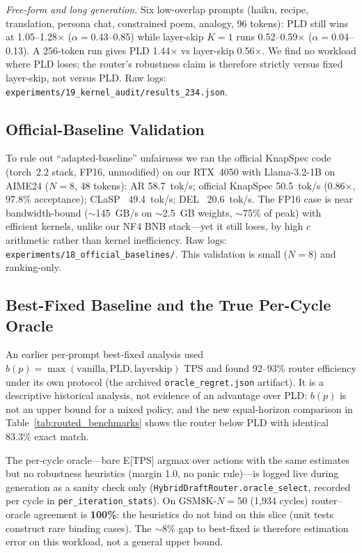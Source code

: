 \documentclass[10pt,twocolumn,letterpaper]{article}
\begin{document}
\textit{Free-form and long generation.} Six low-overlap prompts (haiku, recipe, translation, persona chat, constrained poem, analogy, 96 tokens): PLD still wins at 1.05--1.28$\times$ ($\alpha{=}0.43$--0.85) while layer-skip $K{=}1$ runs 0.52--0.59$\times$ ($\alpha{=}0.04$--0.13). A 256-token run gives PLD 1.44$\times$ vs layer-skip 0.56$\times$. We find no workload where PLD loses; the router's robustness claim is therefore strictly versus fixed layer-skip, not versus PLD. Raw logs: \texttt{experiments/19\_kernel\_audit/results\_234.json}.

\subsection{Official-Baseline Validation}
\label{sec:official}

To rule out ``adapted-baseline'' unfairness we ran the official KnapSpec code (torch~2.2 stack, FP16, unmodified) on our RTX~4050 with Llama-3.2-1B on AIME24 ($N{=}8$, 48 tokens): AR 58.7~tok/s; official KnapSpec 50.5~tok/s (0.86$\times$, 97.8\% acceptance); CLaSP~\cite{clasp2025} 49.4~tok/s; DEL~\cite{del2025} 20.6~tok/s. The FP16 case is near bandwidth-bound ($\sim$145~GB/s on $\sim$2.5~GB weights, $\sim$75\% of peak) with efficient kernels, unlike our NF4 BNB stack---yet it still loses, by high $c$ arithmetic rather than kernel inefficiency. Raw logs: \texttt{experiments/18\_official\_baselines/}. This validation is small ($N{=}8$) and ranking-only.

\subsection{Best-Fixed Baseline and the True Per-Cycle Oracle}
\label{sec:oracle}

An earlier per-prompt best-fixed analysis used $b(p){=}\max(\mathrm{vanilla}, \mathrm{PLD}, \mathrm{layerskip})$ TPS and found 92--93\% router efficiency under its own protocol (the archived \texttt{oracle\_regret.json} artifact). It is a descriptive historical analysis, not evidence of an advantage over PLD: $b(p)$ is not an upper bound for a mixed policy, and the new equal-horizon comparison in Table~\ref{tab:routed_benchmarks} shows the router below PLD with identical 83.3\% exact match.

The per-cycle oracle---bare E[TPS] argmax over actions with the same estimates but no robustness heuristics (margin 1.0, no panic rule)---is logged live during generation as a sanity check only (\texttt{HybridDraftRouter.oracle\_select}, recorded per cycle in \texttt{per\_iteration\_stats}). On GSM8K-$N{=}50$ (1,934 cycles) router--oracle agreement is \textbf{100\%}: the heuristics do not bind on this slice (unit tests construct rare binding cases). The $\sim$8\% gap to best-fixed is therefore estimation error on this workload, not a general upper bound.
\end{document}
